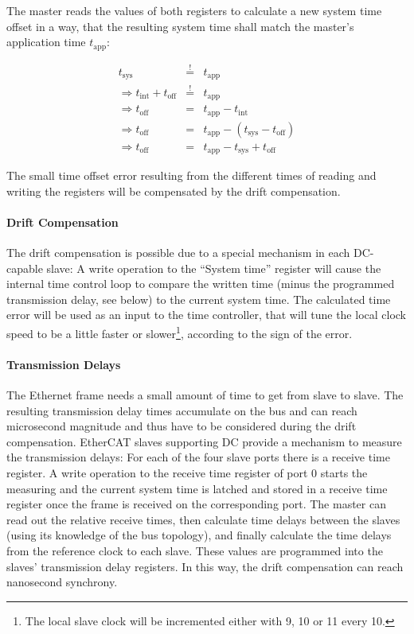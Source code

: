 \documentclass[a4paper,12pt,BCOR6mm,bibtotoc,idxtotoc]{scrbook}
\begin{document}
The master reads the values of both registers to calculate a new system time
offset in a way, that the resulting system time shall match the master's
application time $t_\text{app}$:

\begin{eqnarray}
t_\text{sys} & \stackrel{!}{=} & t_\text{app} \\
\Rightarrow t_\text{int} + t_\text{off} & \stackrel{!}{=} & t_\text{app} \nonumber \\
\Rightarrow t_\text{off} & = & t_\text{app} - t_\text{int} \nonumber \\
\Rightarrow t_\text{off} & = & t_\text{app} - (t_\text{sys} - t_\text{off}) \nonumber \\
\Rightarrow t_\text{off} & = & t_\text{app} - t_\text{sys} + t_\text{off}
\end{eqnarray}

The small time offset error resulting from the different times of reading and
writing the registers will be compensated by the drift compensation.

\paragraph{Drift Compensation} The drift compensation is possible due to a
special mechanism in each DC-capable slave: A write operation to the ``System
time'' register will cause the internal time control loop to compare the
written time (minus the programmed transmission delay, see below) to the
current system time. The calculated time error will be used as an input to the
time controller, that will tune the local clock speed to be a little faster or
slower\footnote{The local slave clock will be incremented either with
\unit{9}{\nano\second}, \unit{10}{\nano\second} or \unit{11}{\nano\second}
every \unit{10}{\nano\second}.}, according to the sign of the error.

\paragraph{Transmission Delays} The Ethernet frame needs a small amount of
time to get from slave to slave. The resulting transmission delay times
accumulate on the bus and can reach microsecond magnitude and thus have to be
considered during the drift compensation. EtherCAT slaves supporting DC
provide a mechanism to measure the transmission delays: For each of the four
slave ports there is a receive time register. A write operation to the receive
time register of port 0 starts the measuring and the current system time is
latched and stored in a receive time register once the frame is received on
the corresponding port. The master can read out the relative receive times,
then calculate time delays between the slaves (using its knowledge of the bus
topology), and finally calculate the time delays from the reference clock to
each slave. These values are programmed into the slaves' transmission delay
registers. In this way, the drift compensation can reach nanosecond synchrony.
\end{document}
